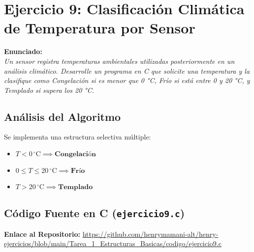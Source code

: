 \documentclass[12pt]{article}
\begin{document}
\section*{Ejercicio 9: Clasificación Climática de Temperatura por Sensor}

\noindent\textbf{Enunciado:}\\
\textit{Un sensor registra temperaturas ambientales utilizadas posteriormente en un análisis climático. Desarrolle un programa en C que solicite una temperatura y la clasifique como Congelación si es menor que 0 °C, Frío si está entre 0 y 20 °C, y Templado si supera los 20 °C.}

\subsection*{Análisis del Algoritmo}
Se implementa una estructura selectiva múltiple:
\begin{itemize}
    \item $T < 0 \, ^\circ\text{C} \implies \textbf{Congelación}$
    \item $0 \le T \le 20 \, ^\circ\text{C} \implies \textbf{Frío}$
    \item $T > 20 \, ^\circ\text{C} \implies \textbf{Templado}$
\end{itemize}

\subsection*{Código Fuente en C (\texttt{ejercicio9.c})}
\noindent\textbf{Enlace al Repositorio:} \url{https://github.com/henrymamani-alt/henry-ejercicios/blob/main/Tarea_1_Estructuras_Basicas/codigo/ejercicio9.c}
\end{document}
